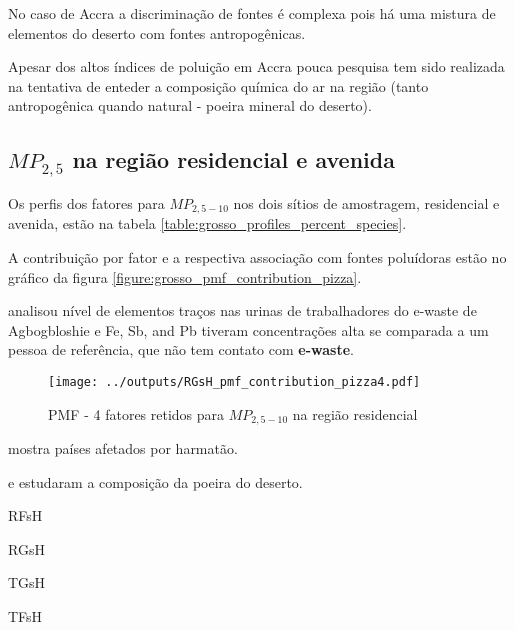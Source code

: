 No caso de Accra a discriminação de fontes é complexa pois
há uma mistura de elementos do deserto com fontes antropogênicas.

Apesar dos altos índices de poluição em Accra pouca pesquisa tem sido 
realizada na tentativa de enteder a composição química do ar na região
(tanto antropogênica quando natural - poeira mineral do deserto). 

\subsection{$MP_{2,5}$ na região residencial e avenida}

Os perfis dos fatores para $MP_{2,5-10}$ nos dois sítios de amostragem, 
residencial e avenida, estão na tabela \ref{table:grosso_profiles_percent_species}.

A contribuição por fator e a respectiva associação com fontes poluídoras
estão no gráfico da figura \ref{figure:grosso_pmf_contribution_pizza}. 

\citep{asante2012} analisou nível de elementos traços nas urinas de trabalhadores 
do e-waste de Agbogbloshie e Fe, Sb, and Pb tiveram concentrações alta se comparada
a um pessoa de referência, que não tem contato com \textbf{e-waste}.

\begin{figure}[H]
\begin{center}
  \texttt{[image: ../outputs/RGsH\_pmf\_contribution\_pizza4.pdf]}
  \caption{PMF - 4 fatores retidos para $MP_{2,5-10}$ na região residencial}
\end{center}
\end{figure}

\citep{kaku2016}

\citep{prospero2002} mostra países afetados por harmatão. 

\citep{engelbrecht2009a} e \citep{engelbrecht2009b} estudaram a composição 
da poeira do deserto.


\begin{table}[H]
  \centering
  \caption{RFsH}
  
\end{table}

\begin{table}[H]
  \centering
  \caption{RGsH}
  
\end{table}

\begin{table}[H]
  \centering
  \caption{TGsH}
  
\end{table}


\begin{table}[H]
  \centering
  \caption{TFsH}
  
\end{table}